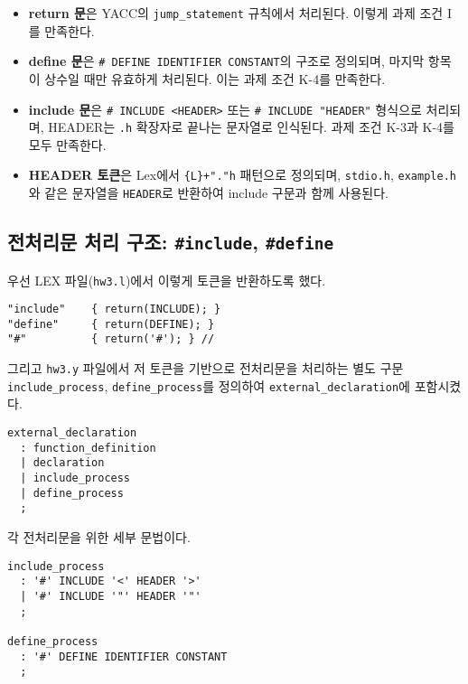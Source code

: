 \documentclass{article}
\begin{document}
\begin{itemize}
  \item \textbf{return 문}은 YACC의 \texttt{jump\_statement} 규칙에서 처리된다. 이렇게 과제 조건 I를 만족한다.

  \item \textbf{define 문}은 \texttt{\# DEFINE IDENTIFIER CONSTANT}의 구조로 정의되며, 마지막 항목이 상수일 때만 유효하게 처리된다. 이는 과제 조건 K-4를 만족한다.

  \item \textbf{include 문}은 \texttt{\# INCLUDE <HEADER>} 또는 \texttt{\# INCLUDE "HEADER"} 형식으로 처리되며, HEADER는 \texttt{.h} 확장자로 끝나는 문자열로 인식된다. 과제 조건 K-3과 K-4를 모두 만족한다.

  \item \textbf{HEADER 토큰}은 Lex에서 \texttt{\{L\}+"."h} 패턴으로 정의되며, \texttt{stdio.h}, \texttt{example.h}와 같은 문자열을 \texttt{HEADER}로 반환하여 include 구문과 함께 사용된다.
\end{itemize}

\subsection{전처리문 처리 구조: \texttt{\#include}, \texttt{\#define}}

  \item 우선 LEX 파일(\texttt{hw3.l})에서 이렇게 토큰을 반환하도록 했다.
\begin{lstlisting}
"include"    { return(INCLUDE); }
"define"     { return(DEFINE); }
"#"          { return('#'); } //
\end{lstlisting}

  \item 그리고 \texttt{hw3.y} 파일에서 저 토큰을 기반으로 전처리문을 처리하는 별도 구문\texttt{include\_process}, \texttt{define\_process}를 정의하여 \texttt{external\_declaration}에 포함시켰다.
\begin{lstlisting}
external_declaration
  : function_definition
  | declaration
  | include_process
  | define_process
  ;
\end{lstlisting}

  \item 각 전처리문을 위한 세부 문법이다.
\begin{lstlisting}
include_process
  : '#' INCLUDE '<' HEADER '>'
  | '#' INCLUDE '"' HEADER '"'
  ;

define_process
  : '#' DEFINE IDENTIFIER CONSTANT
  ;
\end{lstlisting}
\end{document}
